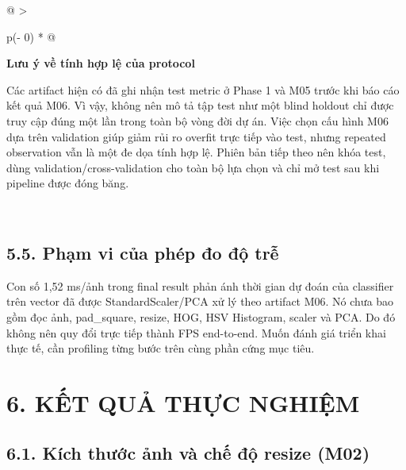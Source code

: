 \documentclass[12pt,a4paper]{article}
\begin{document}
\begin{longtable}[]{@{}
  >{\raggedright\arraybackslash}p{(\columnwidth - 0\tabcolsep) * }@{}}
\toprule\noalign{}
\begin{minipage}[b]{\linewidth}\raggedright
\textbf{Lưu ý về tính hợp lệ của protocol}

Các artifact hiện có đã ghi nhận test metric ở Phase 1 và M05 trước khi
báo cáo kết quả M06. Vì vậy, không nên mô tả tập test như một blind
holdout chỉ được truy cập đúng một lần trong toàn bộ vòng đời dự án.
Việc chọn cấu hình M06 dựa trên validation giúp giảm rủi ro overfit trực
tiếp vào test, nhưng repeated observation vẫn là một đe dọa tính hợp lệ.
Phiên bản tiếp theo nên khóa test, dùng validation/cross-validation cho
toàn bộ lựa chọn và chỉ mở test sau khi pipeline được đóng băng.
\end{minipage} \\
\midrule\noalign{}
\endhead
\bottomrule\noalign{}
\endlastfoot
\end{longtable}

\subsection{5.5. Phạm vi của phép đo độ
trễ}\label{phux1ea1m-vi-cux1ee7a-phuxe9p-ux111o-ux111ux1ed9-trux1ec5}

Con số 1,52 ms/ảnh trong final result phản ánh thời gian dự đoán của
classifier trên vector đã được StandardScaler/PCA xử lý theo artifact
M06. Nó chưa bao gồm đọc ảnh, pad\_square, resize, HOG, HSV Histogram,
scaler và PCA. Do đó không nên quy đổi trực tiếp thành FPS end-to-end.
Muốn đánh giá triển khai thực tế, cần profiling từng bước trên cùng phần
cứng mục tiêu.

\section{6. KẾT QUẢ THỰC
NGHIỆM}\label{kux1ebft-quux1ea3-thux1ef1c-nghiux1ec7m}

\subsection{6.1. Kích thước ảnh và chế độ resize
(M02)}\label{kuxedch-thux1b0ux1edbc-ux1ea3nh-vuxe0-chux1ebf-ux111ux1ed9-resize-m02}
\end{document}
